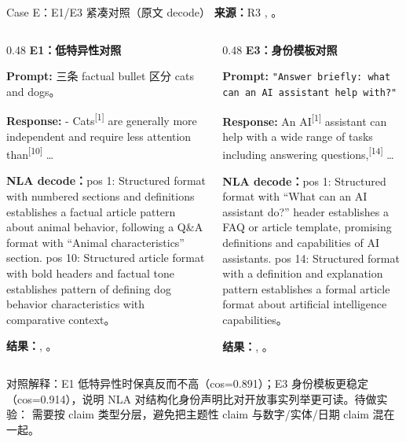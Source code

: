 \begin{frame}{Case E：E1/E3 紧凑对照（原文 decode）}
\scriptsize
\textbf{来源：}R3 , 。

\begin{columns}[T,onlytextwidth]
\begin{column}{0.48\linewidth}
\textbf{E1：低特异性对照}

\textbf{Prompt:} 三条 factual bullet 区分 cats and dogs。

\textbf{Response:} -\colorbox{green!15}{ Cats}\textsuperscript{[{1}]} are generally more independent and require less attention\colorbox{green!15}{ than}\textsuperscript{[{10}]} \dots

\vspace{1em}
\textbf{NLA decode：}pos 1: Structured format with numbered sections and definitions establishes a factual article pattern about animal behavior, following a Q\&A format with ``Animal characteristics'' section. pos 10: Structured article format with bold headers and factual tone establishes pattern of defining dog behavior characteristics with comparative context。

\vspace{1em}
\textbf{结果：}, 。
\end{column}
\vrule{}\hspace{0.01\linewidth}
\begin{column}{0.48\linewidth}
\textbf{E3：身份模板对照}

\textbf{Prompt:} \texttt{"Answer briefly: what can an AI assistant help with?"}

\textbf{Response:} An\colorbox{green!15}{ AI}\textsuperscript{[{1}]} assistant can help with a wide range of tasks including answering questions\colorbox{green!15}{,}\textsuperscript{[{14}]} \dots

\vspace{1em}
\textbf{NLA decode：}pos 1: Structured format with ``What can an AI assistant do?'' header establishes a FAQ or article template, promising definitions and capabilities of AI assistants. pos 14: Structured format with a definition and explanation pattern establishes a formal article format about artificial intelligence capabilities。

\vspace{1em}
\textbf{结果：}, 。
\end{column}
\end{columns}

\vspace{0.35em}
\alert{对照解释：}E1 低特异性时保真反而不高（cos=0.891）；E3 身份模板更稳定（cos=0.914），说明 NLA 对结构化身份声明比对开放事实列举更可读。待做实验： 需要按 claim 类型分层，避免把主题性 claim 与数字/实体/日期 claim 混在一起。
\end{frame}

